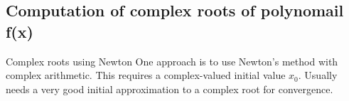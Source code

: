 \documentclass[12pt]{beamer}
\begin{document}
\subsection{Computation of complex roots of polynomail f(x)} 
\begin{frame}{Complex roots using Newton} 
One approach is to use Newton's method with complex arithmetic. 
This requires a complex-valued initial value $x_0$. Usually needs a very good initial approximation to a complex root for convergence. 
\end{frame} 
\end{document}

